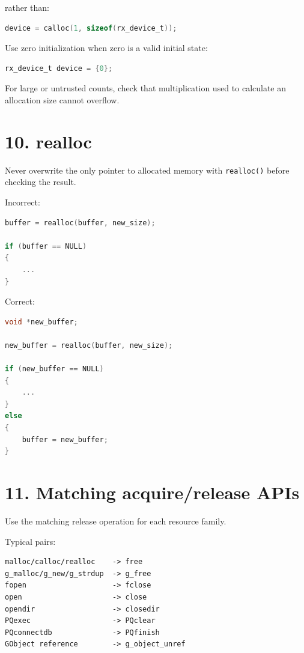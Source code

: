\documentclass[11pt,a4paper]{article}
\begin{document}
rather than:

\begin{lstlisting}[language=C]
device = calloc(1, sizeof(rx_device_t));
\end{lstlisting}

Use zero initialization when zero is a valid initial state:

\begin{lstlisting}[language=C]
rx_device_t device = {0};
\end{lstlisting}

For large or untrusted counts, check that multiplication used to
calculate an allocation size cannot overflow.

\section{10. realloc}\label{10-realloc}

Never overwrite the only pointer to allocated memory with
\passthrough{\lstinline!realloc()!} before checking the result.

Incorrect:

\begin{lstlisting}[language=C]
buffer = realloc(buffer, new_size);

if (buffer == NULL)
{
    ...
}
\end{lstlisting}

Correct:

\begin{lstlisting}[language=C]
void *new_buffer;

new_buffer = realloc(buffer, new_size);

if (new_buffer == NULL)
{
    ...
}
else
{
    buffer = new_buffer;
}
\end{lstlisting}

\section{11. Matching acquire/release
APIs}\label{11-matching-acquirerelease-apis}

Use the matching release operation for each resource family.

Typical pairs:

\begin{lstlisting}
malloc/calloc/realloc    -> free
g_malloc/g_new/g_strdup  -> g_free
fopen                    -> fclose
open                     -> close
opendir                  -> closedir
PQexec                   -> PQclear
PQconnectdb              -> PQfinish
GObject reference        -> g_object_unref
\end{lstlisting}
\end{document}
